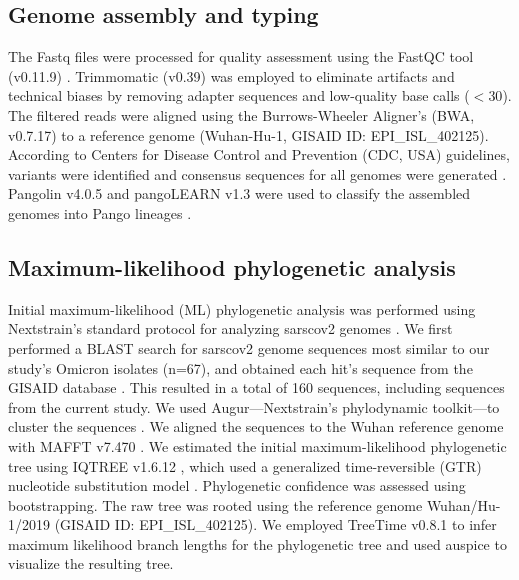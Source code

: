 \subsection{Genome assembly and typing}\label{2:mm-assembly}
The Fastq files were processed for quality assessment using the FastQC tool (v0.11.9) \citep{andrews2010fastqc}.
Trimmomatic (v0.39) \citep{bolger2014trimmomatic} was employed to eliminate artifacts and technical biases by removing adapter sequences and low-quality base calls ($<30$).
The filtered reads were aligned using the Burrows-Wheeler Aligner's (BWA, v0.7.17) \citep{li2010fast} to a reference genome (Wuhan-Hu-1, GISAID ID: EPI\_ISL\_402125).
According to Centers for Disease Control and Prevention (CDC, USA) guidelines, variants were identified and consensus sequences for all genomes were generated \citep{paden2020rapid}.
Pangolin v4.0.5 and pangoLEARN v1.3 were used to classify the assembled genomes into Pango lineages \citep{rambaut2020dynamic,o2021assignment}.


\subsection{Maximum-likelihood phylogenetic analysis}\label{2:mm-ml}
Initial maximum-likelihood (ML) phylogenetic analysis was performed using Nextstrain's standard protocol for analyzing \gls{sarscov2} genomes \citep{hadfield2018nextstrain}.
We first performed a BLAST search for \gls{sarscov2} genome sequences most similar to our study's Omicron isolates (n=67), and obtained each hit's sequence from the GISAID database \citep{shu2017gisaid}.
This resulted in a total of 160 sequences, including sequences from the current study.
We used Augur---Nextstrain's phylodynamic toolkit---to cluster the sequences \citep{huddleston2021augur}.
We aligned the sequences to the Wuhan reference genome with MAFFT v7.470 \citep{katoh2002mafft}.
We estimated the initial maximum-likelihood phylogenetic tree using IQTREE v1.6.12 \citep{nguyen2015iq}, which used a generalized time-reversible (GTR) nucleotide substitution model \citep{tavare1986some, yang1994estimating, zharkikh1994estimation}.
Phylogenetic confidence was assessed using bootstrapping.
The raw tree was rooted using the reference genome Wuhan/Hu-1/2019 (GISAID ID: EPI\_ISL\_402125).
We employed TreeTime v0.8.1 to infer maximum likelihood branch lengths for the phylogenetic tree \citep{sagulenko2018treetime} and used auspice \citep{hadfield2018nextstrain} to visualize the resulting tree.


